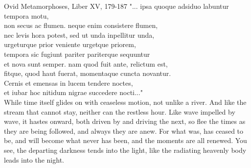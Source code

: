 \begin{prequote}[20pt]{Ovid Metamorphoses, Liber XV, 179-187}
    "... ipsa quoque adsiduo labuntur tempora motu,\\
    non secus ac flumen. neque enim consistere flumen,\\
    nec levis hora potest, sed ut unda inpellitur unda,\\
    urgeturque prior veniente urgetque priorem,\\
    tempora sic fugiunt pariter pariterque sequuntur\\
    et nova sunt semper. nam quod fuit ante, relictum est,\\
    fitque, quod haut fuerat, momentaque cuncta novantur.\\
    Cernis et emensas in lucem tendere noctes,\\
    et iubar hoc nitidum nigrae succedere nocti..."\\

    While time itself glides on with ceaseless motion, not unlike a river.
    And like the stream that cannot stay, neither can the restless hour.
    Like wave impelled by wave, it hastes onward, both driven by
    and driving the next, so flee the times as they are being followed,
    and always they are anew. For what was, has ceased to be,
    and will become what never has been, and the moments are all renewed.
    You see, the departing darkness tends into the light,
    like the radiating heavenly body leads into the night.\\
\end{prequote}